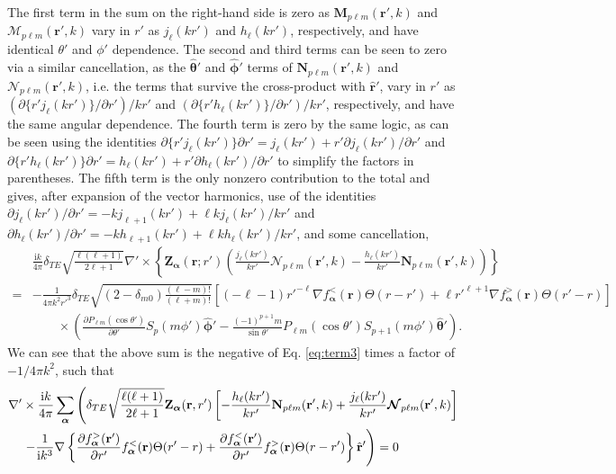 \documentclass{article}
\begin{document}
The first term in the sum on the right-hand side is zero as $\mathbf{M}_{p\ell m}(\mathbf{r}',k)$ and $\bm{\mathcal{M}}_{p\ell m}(\mathbf{r}',k)$ vary in $r'$ as $j_\ell(kr')$ and $h_\ell(kr')$, respectively, and have identical $\theta'$ and $\phi'$ dependence. The second and third terms can be seen to zero via a similar cancellation, as the $\hat{\bm{\theta}}'$ and $\hat{\bm{\phi}}'$ terms of $\mathbf{N}_{p\ell m}(\mathbf{r}',k)$ and $\bm{\mathcal{N}}_{p\ell m}(\mathbf{r}',k)$, i.e. the terms that survive the cross-product with $\hat{\mathbf{r}}'$, vary in $r'$ as $(\partial\{r' j_\ell(kr')\}/\partial r')/kr'$ and $(\partial\{r' h_\ell(kr')\}/\partial r')/kr'$, respectively, and have the same angular dependence. The fourth term is zero by the same logic, as can be seen using the identities $\partial\{r'j_\ell(kr')\}\partial r' = j_\ell(kr') + r'\partial j_\ell(kr')/\partial r'$ and $\partial\{r'h_\ell(kr')\}\partial r' = h_\ell(kr') + r'\partial h_\ell(kr')/\partial r'$ to simplify the factors in parentheses. The fifth term is the only nonzero contribution to the total and gives, after expansion of the vector harmonics, use of the identities $\partial j_\ell(kr')/\partial r' = -kj_{\ell + 1}(kr') + \ell k j_\ell(kr')/kr'$ and $\partial h_\ell(kr')/\partial r' = -kh_{\ell + 1}(kr') + \ell k h_\ell(kr')/kr'$, and some cancellation,
\begin{equation}
\begin{split}
&\frac{\mathrm{i}k}{4\pi}\delta_{TE}\sqrt{\frac{\ell(\ell + 1)}{2\ell + 1}}\nabla'\times\left\{\mathbf{Z}_{\bm{\alpha}}(\mathbf{r};r')\left(\frac{j_\ell(kr')}{kr'}\bm{\mathcal{N}}_{p\ell m}(\mathbf{r}',k) - \frac{h_\ell(kr')}{kr'}\mathbf{N}_{p\ell m}(\mathbf{r}',k)\right)\right\}\\
=& -\frac{1}{4\pi k^2r'^3}\delta_{TE}\sqrt{(2 - \delta_{m0})\frac{(\ell - m)!}{(\ell + m)!}}\left[(-\ell - 1)r'^{-\ell}\nabla f_{\bm{\alpha}}^<(\mathbf{r})\Theta(r - r') + \ell r'^{\ell + 1}\nabla f_{\bm{\alpha}}^>(\mathbf{r})\Theta(r' - r)\right]\\
&\qquad\times\left(\frac{\partial P_{\ell m}(\cos\theta')}{\partial \theta'}S_p(m\phi')\hat{\bm{\phi}}' - \frac{(-1)^{p+1}m}{\sin\theta'}P_{\ell m}(\cos\theta')S_{p+1}(m\phi')\hat{\bm{\theta}}'\right).
\end{split}
\end{equation}
We can see that the above sum is the negative of Eq. \eqref{eq:term3} times a factor of $-1/4\pi k^2$, such that
\begin{equation}
\begin{split}
\nabla'&\times\frac{\mathrm{i}k}{4\pi}\sum_{\bm{\alpha}}\left(\delta_{TE}\sqrt{\frac{\ell(\ell + 1)}{2\ell + 1}}\mathbf{Z}_{\bm{\alpha}}(\mathbf{r},r')\left[-\frac{h_\ell(kr')}{kr'}\mathbf{N}_{p\ell m}(\mathbf{r}',k) + \frac{j_\ell(kr')}{kr'}\bm{\mathcal{N}}_{p\ell m}(\mathbf{r}',k)\right]\right.\\
&\left. -\frac{1}{\mathrm{i} k^3}\nabla\left\{\frac{\partial f_{\bm{\alpha}}^>(\mathbf{r}')}{\partial r'}f_{\bm{\alpha}}^<(\mathbf{r})\Theta(r' - r) + \frac{\partial f_{\bm{\alpha}}^<(\mathbf{r}')}{\partial r'}f_{\bm{\alpha}}^>(\mathbf{r})\Theta(r - r')\right\}\hat{\mathbf{r}}' \vphantom{\sqrt{\frac{\ell(\ell + 1)}{2\ell + 1}}} \right) = 0
\end{split}
\end{equation}
\end{document}
